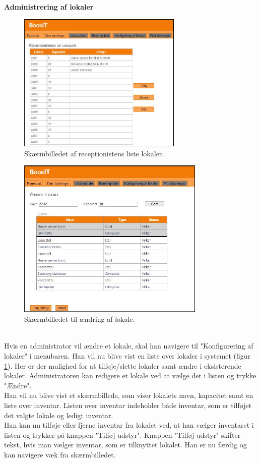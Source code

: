 \textbf{Administrering af lokaler}
\begin{figure}[h!]
  \centering
    \includegraphics[width=0.7\textwidth]{Appendix/GUI-Prototype/DigitalMockup/LokaleListe}
  \caption{Skærmbilledet af receptionistens liste lokaler.}
\label{Design_G_Development_LokaleListe_Final}
\end{figure}
\begin{figure}[h!]
  \centering
    \includegraphics[width=0.8\textwidth]{Appendix/GUI-Prototype/DigitalMockup/AendreLokale}
  \caption{Skærmbilledet til ændring af lokale.}
\label{Design_G_Development_AendreLokale_Final}
\end{figure} 
\\Hvis en administrator vil ændre et lokale, skal han navigere til "Konfigurering af lokaler" i menubaren. Han vil nu blive vist en liste over lokaler i systemet (figur \ref{Design_G_Development_LokaleListe_Final}). Her er der mulighed for at tilføje/slette lokaler samt ændre i eksisterende lokaler. Administratoren kan redigere et lokale ved at vælge det i listen og trykke "Ændre". 
\\Han vil nu blive vist et skærmbillede, som viser lokalets navn, kapacitet samt en liste over inventar. Listen over inventar indeholder både inventar, som er tilføjet det valgte lokale og ledigt inventar.
\\Han kan nu tilføje eller fjerne inventar fra lokalet ved, at han vælger inventaret i listen og trykker på knappen "Tilføj udstyr". Knappen "Tilføj udstyr" skifter tekst, hvis man vælger inventar, som er tilknyttet lokalet. Han er nu færdig og kan navigere væk fra skærmbilledet.

